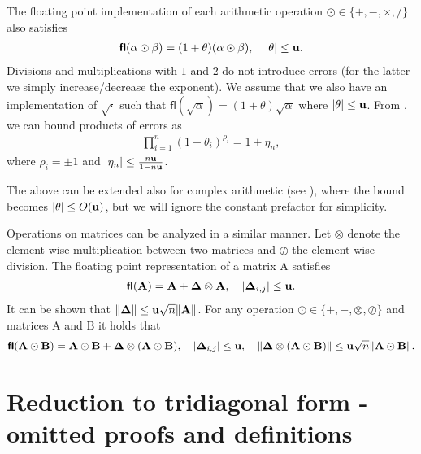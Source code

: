 \documentclass{article}
\newcommand\matA{\boldsymbol{\mathrm{A}}}
\newcommand\matB{\boldsymbol{\mathrm{B}}}
\newcommand\matDelta{\boldsymbol{\mathrm{\Delta}}}
\newcommand{\fl}{\boldsymbol{\mathsf{fl}}}
\newcommand{\umach}{\textbf{\textup{u}}}
\begin{document}
The floating point implementation of each arithmetic operation $\odot \in\{+,-,\times,/\}$ also satisfies
\begin{align}
    \fl(\alpha\odot\beta) = (1+\theta)(\alpha\odot\beta),\quad |\theta|\leq\umach.
\end{align}
Divisions and multiplications with $1$ and $2$ do not introduce errors (for the latter we simply increase/decrease the exponent).
We assume that we also have an implementation of $\sqrt{\cdot}$ such that $\fl(\sqrt{\alpha})=(1+\theta)\sqrt{\alpha}$ where $|\theta|\leq \umach$.
From \cite[Lemma 3.1]{higham2002accuracy}, we can bound products of errors as
\begin{align*}
    \prod_{i=1}^n (1+\theta_i)^{\rho_i} = 1+\eta_n,
\end{align*}
where $\rho_i=\pm 1$ and $|\eta_n|\leq \tfrac{n\umach}{1-n\umach}$.

The above can be extended also for complex arithmetic (see \cite[Lemma 3.5]{higham2002accuracy}), where the bound becomes $|\theta|\leq O(\umach)$, but we will ignore the constant prefactor for simplicity. 

Operations on matrices can be analyzed in a similar manner. Let $\otimes$ denote the element-wise multiplication between two matrices and $\oslash$ the element-wise division. The floating point representation of a matrix $\matA$ satisfies
\begin{align*}
    \fl(\matA) = \matA+\matDelta \otimes \matA,\quad |\matDelta_{i,j}|\leq \umach.
\end{align*}
It can be shown that $\|\matDelta\|\leq \umach\sqrt{n}\|\matA\|$. 
For any operation $\odot\in\{+,-,\otimes,\oslash\}$ and matrices $\matA$ and $\matB$ it holds that
\begin{align}
    \label{eq:matrix_flop_errors}
    \fl(\matA\odot \matB) = \matA \odot \matB +\matDelta\otimes(\matA \odot \matB), 
    \quad 
    |\matDelta_{i,j}|\leq \umach, 
    \quad 
    \|\matDelta\otimes(\matA \odot \matB)\|\leq \umach\sqrt{n}\|\matA\odot\matB\|.
\end{align}




\section{Reduction to tridiagonal form - omitted proofs and definitions}
\label{appendix:tridiagonal_reduction}
\end{document}
